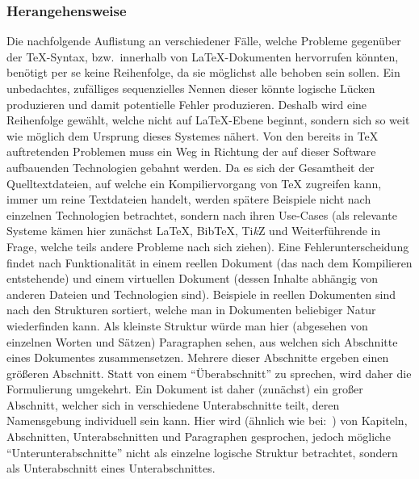 \subsubsection*{Herangehensweise}
Die nachfolgende Auflistung an verschiedener Fälle, welche Probleme gegenüber der \TeX{}-Syntax, bzw.\ innerhalb von \LaTeX{}-Dokumenten hervorrufen könnten, benötigt per se keine Reihenfolge, da sie möglichst alle behoben sein sollen. Ein unbedachtes, zufälliges sequenzielles Nennen dieser könnte logische Lücken produzieren und damit potentielle Fehler produzieren. 
Deshalb wird eine Reihenfolge gewählt, welche nicht auf \LaTeX{}-Ebene beginnt, sondern sich so weit wie möglich dem Ursprung dieses Systemes nähert.
Von den bereits in \TeX{} auftretenden Problemen muss ein Weg in Richtung der auf dieser Software aufbauenden Technologien gebahnt werden. Da es sich der Gesamtheit der Quelltextdateien, auf welche ein Kompiliervorgang von \TeX{} zugreifen kann, immer um reine Textdateien handelt, werden spätere Beispiele nicht nach einzelnen Technologien betrachtet, sondern nach ihren Use-Cases (als relevante Systeme kämen hier zunächst \LaTeX{}, Bib\TeX{}, Ti\textit{k}Z und Weiterführende in Frage, welche teils andere Probleme nach sich ziehen).%
Eine Fehlerunterscheidung findet nach Funktionalität in einem reellen Dokument (das nach dem Kompilieren entstehende) und einem virtuellen Dokument (dessen Inhalte abhängig von anderen Dateien und Technologien sind). 
Beispiele in reellen Dokumenten sind nach den Strukturen sortiert, welche man in Dokumenten beliebiger Natur wiederfinden kann. Als kleinste Struktur würde man hier (abgesehen von einzelnen Worten und Sätzen) Paragraphen sehen, aus welchen sich Abschnitte eines Dokumentes zusammensetzen. Mehrere dieser Abschnitte ergeben einen größeren Abschnitt. Statt von einem \enquote{Überabschnitt} zu sprechen, wird daher die Formulierung umgekehrt. Ein Dokument ist daher (zunächst) ein großer Abschnitt, welcher sich in verschiedene Unterabschnitte teilt, deren Namensgebung individuell sein kann. Hier wird (ähnlich wie bei:~\cite{texbook}) von Kapiteln, Abschnitten, Unterabschnitten und Paragraphen gesprochen, jedoch mögliche \enquote{Unterunterabschnitte} nicht als einzelne logische Struktur betrachtet, sondern als Unterabschnitt eines Unterabschnittes. 
